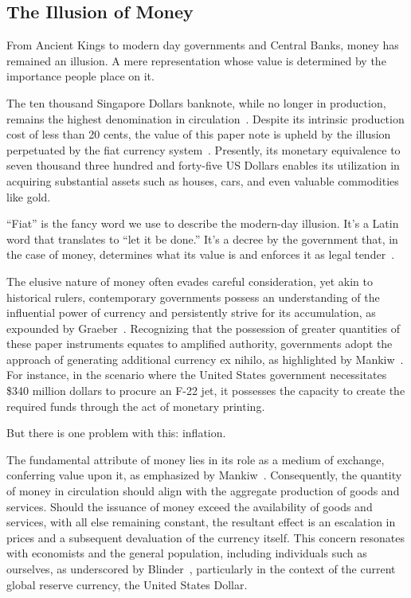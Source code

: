 \subsection{The Illusion of Money}
From Ancient Kings to modern day governments and Central Banks, money has remained an illusion. A mere representation whose value is determined
by the importance people place on it.

The ten thousand Singapore Dollars banknote, while no longer in production, remains the highest denomination in circulation~\cite{goodhart1998}.
Despite its intrinsic production cost of less than 20 cents, the value of this paper note is upheld by the illusion perpetuated by the fiat
currency system~\cite{gupta2019}. Presently, its monetary equivalence to seven thousand three hundred and forty-five US Dollars enables its
utilization in acquiring substantial assets such as houses, cars, and even valuable commodities like gold.

“Fiat” is the fancy word we use to describe the modern-day illusion. It's a Latin word that translates to “let it be done.” It's a decree by
the government that, in the case of money, determines what its value is and enforces it as legal tender~\cite{reinhart2018, friedman2000}.

The elusive nature of money often evades careful consideration, yet akin to historical rulers, contemporary governments possess an understanding
of the influential power of currency and persistently strive for its accumulation, as expounded by Graeber~\cite{graeber2011}. Recognizing that
the possession of greater quantities of these paper instruments equates to amplified authority, governments adopt the approach of generating
additional currency ex nihilo, as highlighted by Mankiw~\cite{mankiw2014}. For instance, in the scenario where the United States government
necessitates \$340 million dollars to procure an F-22 jet, it possesses the capacity to create the required funds through the act of monetary
printing.

But there is one problem with this: inflation.

The fundamental attribute of money lies in its role as a medium of exchange, conferring value upon it, as emphasized by Mankiw~\cite{mankiw2014}.
Consequently, the quantity of money in circulation should align with the aggregate production of goods and services. Should the issuance of
money exceed the availability of goods and services, with all else remaining constant, the resultant effect is an escalation in prices and a
subsequent devaluation of the currency itself. This concern resonates with economists and the general population, including individuals such as
ourselves, as underscored by Blinder~\cite{blinder2010}, particularly in the context of the current global reserve currency, the United States
Dollar.

